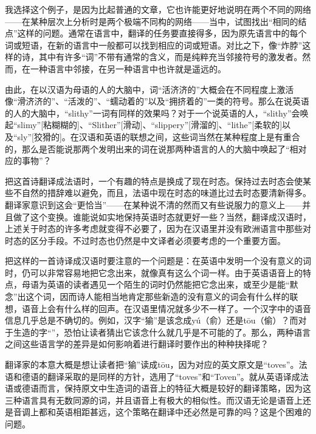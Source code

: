 我选择这个例子，是因为比起普通的文章，它也许能更好地说明在两个不同的网络——在某种层次上分析时是两个极端不同构的网络——当中，试图找出“相同的结点”这样的问题。通常在语言中，翻译的任务要直接得多，因为原先语言中的每个词或短语，在新的语言中一般都可以找到相应的词或短语。对比之下，像“炸脖”这样的诗，其中有许多“词”不带有通常的含义，而是纯粹充当邻接符号的激发者。然而，在一种语言中邻接，在另一种语言中也许就是遥远的。

由此，在以汉语为母语的人的大脑中，词“活济济的”大概会在不同程度上激活像“滑济济的”、“活泼的”、“蠕动着的”以及“拥挤着的”一类的符号。那么在说英语的人的大脑中，“slithy”一词有同样的效果吗？对于一个说英语的人，“slithy”会唤起“slimy”[粘糊糊的]、“Slither”[滑动]、“slippery”[滑溜的]、“lithe”[柔软的]以及“sly”[狡猾的]。在汉语和英语的联想之间，这些词当然在某种程度上是有重合的，那么是否能说那两个发明出来的词在说那两种语言的人的大脑中唤起了“相对应的事物”？

把这首诗翻译成法语时，一个有趣的特点是换成了现在时态。保持过去时态会使某些不自然的措辞难以避免，而且，法语中现在时态的味道比过去时态要清新得多。翻译家意识到这会“更恰当”——在某种说不清的然而又有些说服力的意义上——并且做了这个变换。谁能说如实地保持英语时态就更好一些？当然，翻译成汉语时，上述关于时态的许多考虑就变得不必要了，因为在汉语里并没有欧洲语言中那些对时态的区分手段。不过时态也仍然是中文译者必须要考虑的一个重要方面。

把这样的一首诗译成汉语时要注意的一个问题是：在英语中发明一个没有意义的词时，仍可以非常容易地把它念出来，就像真有这么个词一样。由于英语语音上的特点，母语为英语的读者遇见一个陌生的词时仍然能把它念出来，或至少是能“默念”出这个词，因而诗人能相当地肯定那些新造的没有意义的词会有什么样的联想，语音上会有什么样的回声。在汉语里情况就多少不一样了。一个汉字中的语音信息几乎总是不确切的。例如，汉字“㺄”是该念成yú（俞）还是tōu（偷）？而对于生造的字“”，恐怕让读者猜出它该念什么就几乎是不可能的了。那么，两种语言之间这些语言学的差异是如何影响着进行翻译时要作出的种种抉择呢？

翻译家的本意大概是想让读者把“㺄”读成tōu，因为对应的英文原文是“toves”。法语和德语的翻译采取的是同样的方针，选用了“toves”和“Toven”。就从英语译成法语或德语而言，保持原文中生造词的语音上的特征大概是较好的翻译策略，因为这三种语言具有无数同源的词，并且语音上有极大的相似性。而汉语无论是语音上还是音调上都和英语相距甚远，这个策略在翻译中还必然是可靠的吗？这是个困难的问题。


